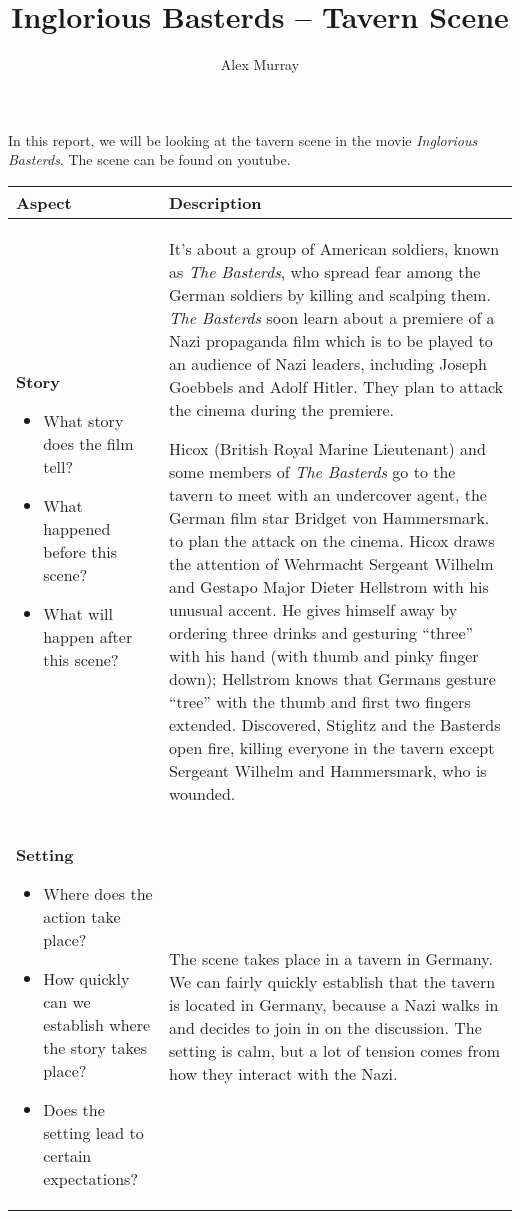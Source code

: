 \documentclass[notitlepage]{fhnwreport}
\title{Inglorious Basterds -- Tavern Scene}
\author{Alex Murray}
\begin{document}
\maketitle

In  this  report,  we  will  be  looking  at  the  tavern scene in  the  movie
\textit{Inglorious    Basterds}.    The    scene    can    be     found     on
youtube\cite{ref:scene}.

\begin{center}
\begin{threeparttable}
    \begin{tabular}{p{6.8cm}p{8.2cm}}
        \toprule
        \textbf{Aspect} & \textbf{Description} \\
\midrule
\textbf{Story}
\begin{itemize}
    \item What story does the film tell?
    \item What happened before this scene?
    \item What will happen after this scene?
\end{itemize} &
It's about a group of  American  soldiers, known as \textit{The Basterds}, who
spread  fear  among  the   German  soldiers  by  killing  and  scalping  them.
\textit{The Basterds} soon  learn  about  a premiere of a Nazi propaganda film
which  is  to  be  played  to  an  audience of Nazi leaders, including  Joseph
Goebbels and Adolf Hitler. They plan to attack the cinema during the premiere.

Hicox  (British  Royal  Marine  Lieutenant)  and  some  members of \textit{The
Basterds} go to the tavern to meet with an  undercover  agent, the German film
star Bridget von Hammersmark. to plan the attack on  the  cinema.  Hicox draws
the attention of Wehrmacht Sergeant Wilhelm and Gestapo Major Dieter Hellstrom
with his unusual accent.  He  gives  himself away by ordering three drinks and
gesturing  ``three''  with  his hand  (with  thumb  and  pinky  finger  down);
Hellstrom  knows  that  Germans  gesture ``tree'' with the thumb and first two
fingers extended.  Discovered,  Stiglitz  and  the Basterds open fire, killing
everyone  in  the  tavern except Sergeant  Wilhelm  and  Hammersmark,  who  is
wounded.
\\

\midrule
\textbf{Setting}
\begin{itemize}
    \item Where does the action take place?
    \item How quickly can we establish where the story takes place?
    \item Does the setting lead to certain expectations?
\end{itemize} &
The scene takes place in a tavern  in Germany. We can fairly quickly establish
that the tavern is located in Germany,  because a Nazi walks in and decides to
join  in  on  the  discussion. The setting is calm, but a lot of tension comes
from how they interact with the Nazi.
\\

        \midrule
        \end{tabular}
    \end{threeparttable}
\end{center}
\end{document}

